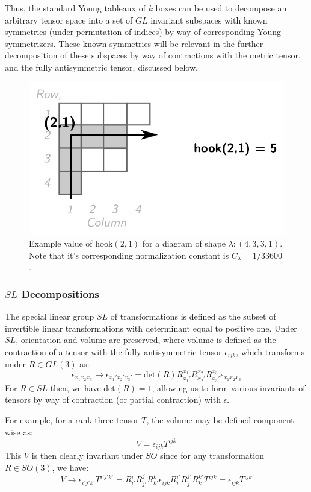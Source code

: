 \documentclass[10pt,a4paper]{article}
\begin{document}
Thus, the standard Young tableaux of $k$ boxes can be used to decompose an arbitrary tensor space into a set of $GL$ invariant subspaces with known symmetries (under permutation of indices) by way of corresponding Young symmetrizers. These known symmetries will be relevant in the further decomposition of these subspaces by way of contractions with the metric tensor, and the fully antisymmetric tensor, discussed below.
\begin{figure}\centering
\includegraphics[scale=0.6]{hook-ex.pdf}
\caption{Example value of $\text{hook}(2,1)$ for a diagram of shape $\lambda:(4,3,3,1)$. Note that it's corresponding normalization constant is $C_{\lambda}=1/33600$.}
\end{figure}



\subsubsection{$SL$ Decompositions}
The special linear group $SL$ of transformations is defined as the subset of invertible linear transformations with determinant equal to positive one. Under $SL$, orientation and volume are preserved, where volume is defined as the contraction of a tensor with the fully antisymmetric tensor $\epsilon_{ijk}$, which transforms under $R\in GL(3)$ as:
$$
\epsilon_{x_1x_2x_3} \rightarrow\epsilon_{x_1'x_2'x_3'} =\text{det}(R) R_{x_1'}^{x_1} R_{x_2'}^{x_2}R_{x_3'}^{x_3}\epsilon_{x_1x_2x_3} 
$$
For $R\in SL$ then, we have $\text{det}(R)=1$, allowing us to form various invariants of tensors by way of contraction (or partial contraction) with $\epsilon$. 

For example, for a rank-three tensor $T$, the volume may be defined component-wise as:
$$
V = \epsilon_{ijk}T^{ijk}
$$
This $V$ is then clearly invariant under $SO$ since for any transformation $R\in SO(3)$, we have:
$$
V\rightarrow\epsilon_{i'j'k'}T^{i'j'k'} =  R_{i'}^{i} R_{j'}^{j}R_{k'}^{k}\epsilon_{ijk}R_{i}^{i'} R_{j}^{j'}R_{k}^{k'}T^{ijk} =\epsilon_{ijk}T^{ijk}
$$
\end{document}
